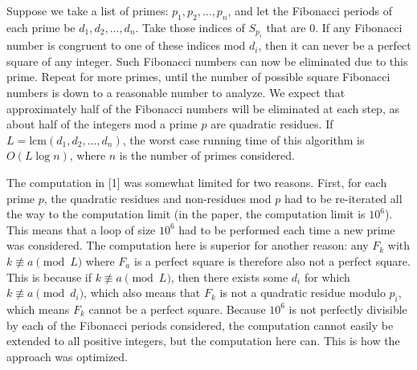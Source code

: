 \documentclass[11pt]{article}
\begin{document}
Suppose we take a list of primes: $p_1, p_2, \dots , p_n$, and let the Fibonacci periods of each prime be $d_1, d_2, \dots , d_n$. Take those indices of $S_{p_i}$ that are 0. If any Fibonacci number is congruent to one of these indices mod $d_i$, then it can never be a perfect square of any integer. Such Fibonacci numbers can now be eliminated due to this prime. Repeat for more primes, until the number of possible square Fibonacci numbers is down to a reasonable number to analyze. We expect that approximately half of the Fibonacci numbers will be eliminated at each step, as about half of the integers mod a prime $p$ are quadratic residues. If $L = \text{lcm}(d_1,d_2,\dots,d_n)$, the worst case running time of this algorithm is $O(L\log n)$, where $n$ is the number of primes considered.

The computation in [1] was somewhat limited for two reasons. First, for each prime $p$, the quadratic residues and non-residues mod $p$ had to be re-iterated all the way to the computation limit (in the paper, the computation limit is $10^6$). This means that a loop of size $10^6$ had to be performed each time a new prime was considered. The computation here is superior for another reason: any $F_k$ with $k \not\equiv a \pmod L$ where $F_a$ is a perfect square is therefore also not a perfect square. This is because if $k \not\equiv a \pmod L$, then there exists some $d_i$ for which $k \not\equiv a \pmod d_i$, which also means that $F_k$ is not a quadratic residue modulo $p_i$, which means $F_k$ cannot be a perfect square. Because $10^6$ is not perfectly divisible by each of the Fibonacci periods considered, the computation cannot easily be extended to all positive integers, but the computation here can. This is how the approach was optimized.
\end{document}
